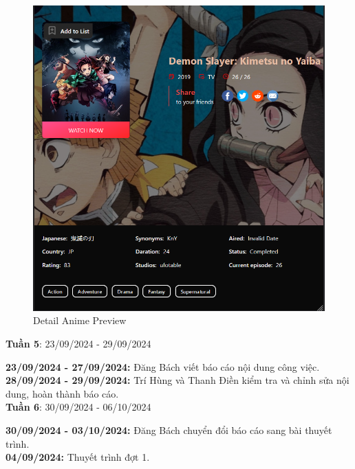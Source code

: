 \begin{figure}[H]
    \centering
    \includegraphics[width=0.6\linewidth]{content/planning/image/detail.png}
    \caption{Detail Anime Preview}
    \label{fig:enter-label}
\end{figure}

\textbf{Tuần 5}: 23/09/2024 - 29/09/2024

\textbf{23/09/2024 - 27/09/2024:} Đăng Bách viết báo cáo nội dung công việc.\\
\textbf{28/09/2024 - 29/09/2024:} Trí Hùng và Thanh Điền kiểm tra và chỉnh sửa nội dung, hoàn thành báo cáo. 
\vspace{1cm}
\\
\textbf{Tuần 6}: 30/09/2024 - 06/10/2024

\textbf{30/09/2024 - 03/10/2024:} Đăng Bách chuyển đổi báo cáo sang bài thuyết trình. \\
\textbf{04/09/2024:} Thuyết trình đợt 1.
\pagebreak
